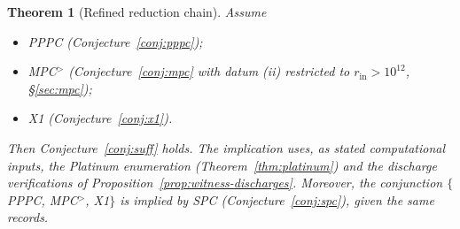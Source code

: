 \documentclass[11pt]{amsart}
\theoremstyle{plain}
\newtheorem{theorem}{Theorem}[section]
\theoremstyle{definition}
\theoremstyle{remark}
\numberwithin{equation}{section}
\begin{document}
\begin{theorem}[Refined reduction chain]\label{thm:sharpened-chain}
Assume
\begin{itemize}
\item PPPC (Conjecture~\ref{conj:pppc});
\item MPC$^{>}$ (Conjecture~\ref{conj:mpc} with datum (ii) restricted to $r_{\mathrm{in}} > 10^{12}$, \S\ref{sec:mpc});
\item X1 (Conjecture~\ref{conj:x1}).
\end{itemize}
Then Conjecture~\ref{conj:suff} holds. The implication uses, as stated computational inputs, the Platinum enumeration (Theorem~\ref{thm:platinum}) and the discharge verifications of Proposition~\ref{prop:witness-discharges}. Moreover, the conjunction $\{$PPPC, MPC$^{>}$, X1$\}$ is implied by SPC (Conjecture~\ref{conj:spc}), given the same records.
\end{theorem}
\end{document}
